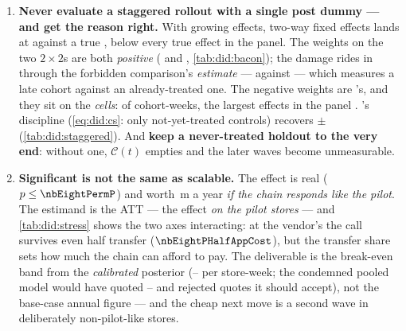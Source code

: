 \begin{enumerate}[leftmargin=*, itemsep=.45em]
  \item \textbf{Never evaluate a staggered rollout with a single post dummy --- and get the reason
        right.} With growing effects, two-way fixed effects lands at \eur{\nbEightTwfeNaive} against
        a true \eur{\nbEightTwfeTrue}, below every true effect in the panel. The
        \citeauthor{goodmanbacon2021} weights on the two $2 \times 2$s are both \emph{positive}
        (\nbEightBaconWClean{} and \nbEightBaconWForbidden, \cref{tab:did:bacon}); the damage rides
        in through the forbidden comparison's \emph{estimate} ---
        \eur{\nbEightBaconDidForbidden} against \eur{\nbEightBaconDidClean} --- which measures a late
        cohort against an already-treated one. The negative weights are \citeauthor{dechaisemartin2020}'s,
        and they sit on the \emph{cells}: \nbEightBaconNegCells{} of \nbEightBaconTreatedCells{}
        cohort-weeks, the largest effects in the panel \citep{goodmanbacon2021, dechaisemartin2020}.
        's discipline (\cref{eq:did:cs}: only not-yet-treated controls)
        recovers \eur{\nbEightCsAtt} $\pm$ \eur{\nbEightCsSe} (\cref{tab:did:staggered}). And
        \textbf{keep a never-treated holdout to the very end}: without one, $\mathcal C(t)$ empties
        and the later waves become unmeasurable.

  \item \textbf{Significant is not the same as scalable.} The effect is real
        ($p \le \nbEightPermP$) and worth \eur{\nbEightAnnualMeanM}\,m a year \emph{if the chain
        responds like the pilot}. The estimand is the ATT --- the effect \emph{on the pilot stores}
        --- and \cref{tab:did:stress} shows the two axes interacting: at the vendor's
        \eur{\nbEightAppCost} the call survives even half transfer ($\nbEightPHalfAppCost$), but the
        transfer share sets how much the chain can afford to pay. The deliverable is the break-even
        band from the \emph{calibrated} posterior
        (\eur{\nbEightCapHalfFe}--\eur{\nbEightCapFullFe} per store-week; the condemned pooled model
        would have quoted \eur{\nbEightCapHalf}--\eur{\nbEightCapFull} and rejected quotes it should
        accept), not the base-case annual figure --- and the cheap next move is a second wave in
        deliberately non-pilot-like stores.
\end{enumerate}


